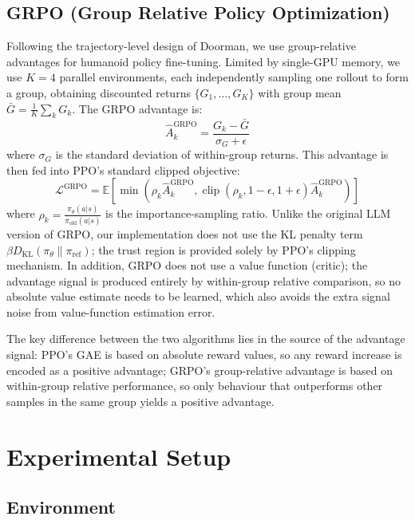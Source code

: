 \subsection{GRPO (Group Relative Policy Optimization)}

Following the trajectory-level design of Doorman\cite{xue2026opening}, we use group-relative advantages for humanoid policy fine-tuning. Limited by single-GPU memory, we use $K = 4$ parallel environments, each independently sampling one rollout to form a group, obtaining discounted returns $\{G_1, \ldots, G_K\}$ with group mean $\bar{G} = \frac{1}{K}\sum_k G_k$. The GRPO advantage is:
\begin{equation}
  \hat{A}_k^{\text{GRPO}} = \frac{G_k - \bar{G}}{\sigma_G + \epsilon}
\end{equation}
where $\sigma_G$ is the standard deviation of within-group returns. This advantage is then fed into PPO's standard clipped objective:
\begin{equation}
  \mathcal{L}^{\text{GRPO}} = \mathbb{E}\left[\min\left(\rho_k \hat{A}_k^{\text{GRPO}}, \operatorname{clip}(\rho_k, 1-\epsilon, 1+\epsilon)\hat{A}_k^{\text{GRPO}}\right)\right]
\end{equation}
where $\rho_k = \frac{\pi_\theta(a|s)}{\pi_{\text{old}}(a|s)}$ is the importance-sampling ratio. Unlike the original LLM version of GRPO, our implementation does not use the KL penalty term $\beta D_{\text{KL}}(\pi_\theta \parallel \pi_{\text{ref}})$; the trust region is provided solely by PPO's clipping mechanism. In addition, GRPO does not use a value function (critic); the advantage signal is produced entirely by within-group relative comparison, so no absolute value estimate needs to be learned, which also avoids the extra signal noise from value-function estimation error.

The key difference between the two algorithms lies in the source of the advantage signal: PPO's GAE is based on absolute reward values, so any reward increase is encoded as a positive advantage; GRPO's group-relative advantage is based on within-group relative performance, so only behaviour that outperforms other samples in the same group yields a positive advantage.

\section{Experimental Setup}

\subsection{Environment}

